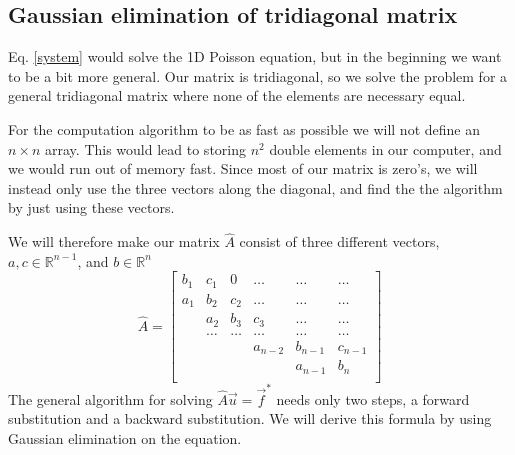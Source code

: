 \documentclass[%
 reprint,
nofootinbib,
 amsmath,amssymb,
 aps,
]{revtex4-1}
\begin{document}
\subsection{Gaussian elimination of tridiagonal matrix}
Eq. \eqref{system} would solve the 1D Poisson equation, but in the beginning we want to be a bit more general. Our matrix is tridiagonal, so we solve the problem for a general tridiagonal matrix where none of the elements are necessary equal.

For the computation algorithm to be as fast as possible we will not define an $n\times n$ array. This would lead to storing $n^2$ double elements in our computer, and we would run out of memory fast. Since most of our matrix is zero's, we will instead only use the three vectors along the diagonal, and find the the algorithm by just using these vectors.

We will therefore make our matrix $\hat{A}$ consist of three different vectors, $a,c\in \mathds{R}^{n-1}$, and $b\in \mathds{R}^{n}$
\begin{equation}
  \hat{A} =
\begin{bmatrix}
       b_1& c_1 & 0 &\dots   & \dots &\dots \\
       a_1 & b_2 & c_2 &\dots &\dots &\dots \\
       & a_2 & b_3 & c_3 & \dots & \dots \\
       & \dots   & \dots &\dots   &\dots & \dots \\
       &   &  &a_{n-2}  &b_{n-1}& c_{n-1} \\
       &    &  &   &a_{n-1} & b_n \\
\end{bmatrix}
\end{equation}
The general algorithm for solving $\hat{A}\vec{u} = \vec{f}^*$ needs only two steps, a forward substitution and a backward substitution. We will derive this formula by using Gaussian elimination on the equation. \\
\end{document}
